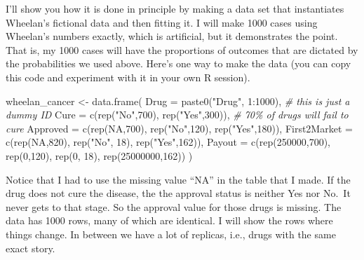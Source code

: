 \documentclass[
  openany]{book}
\newenvironment{Shaded}{\begin{snugshade}}{\end{snugshade}}
\newcommand{\AttributeTok}[1]{\textcolor[rgb]{0.77,0.63,0.00}{#1}}
\newcommand{\CommentTok}[1]{\textcolor[rgb]{0.56,0.35,0.01}{\textit{#1}}}
\newcommand{\ConstantTok}[1]{\textcolor[rgb]{0.00,0.00,0.00}{#1}}
\newcommand{\DecValTok}[1]{\textcolor[rgb]{0.00,0.00,0.81}{#1}}
\newcommand{\FunctionTok}[1]{\textcolor[rgb]{0.00,0.00,0.00}{#1}}
\newcommand{\NormalTok}[1]{#1}
\newcommand{\OtherTok}[1]{\textcolor[rgb]{0.56,0.35,0.01}{#1}}
\newcommand{\SpecialCharTok}[1]{\textcolor[rgb]{0.00,0.00,0.00}{#1}}
\newcommand{\StringTok}[1]{\textcolor[rgb]{0.31,0.60,0.02}{#1}}
\begin{document}
I'll show you how it is done in principle by making a data set that instantiates Wheelan's fictional data and then fitting it. I will make 1000 cases using Wheelan's numbers exactly, which is artificial, but it demonstrates the point. That is, my 1000 cases will have the proportions of outcomes that are dictated by the probabilities we used above. Here's one way to make the data (you can copy this code and experiment with it in your own R session).

\begin{Shaded}
\begin{Highlighting}[]
\NormalTok{wheelan\_cancer }\OtherTok{\textless{}{-}} \FunctionTok{data.frame}\NormalTok{(}
   \AttributeTok{Drug =} \FunctionTok{paste0}\NormalTok{(}\StringTok{"Drug"}\NormalTok{, }\DecValTok{1}\SpecialCharTok{:}\DecValTok{1000}\NormalTok{), }\CommentTok{\# this is just a dummy ID}
   \AttributeTok{Cure =} \FunctionTok{c}\NormalTok{(}\FunctionTok{rep}\NormalTok{(}\StringTok{"No"}\NormalTok{,}\DecValTok{700}\NormalTok{), }\FunctionTok{rep}\NormalTok{(}\StringTok{"Yes"}\NormalTok{,}\DecValTok{300}\NormalTok{)), }\CommentTok{\# 70\% of drugs will fail to cure}
   \AttributeTok{Approved =} \FunctionTok{c}\NormalTok{(}\FunctionTok{rep}\NormalTok{(}\ConstantTok{NA}\NormalTok{,}\DecValTok{700}\NormalTok{), }\FunctionTok{rep}\NormalTok{(}\StringTok{"No"}\NormalTok{,}\DecValTok{120}\NormalTok{), }\FunctionTok{rep}\NormalTok{(}\StringTok{"Yes"}\NormalTok{,}\DecValTok{180}\NormalTok{)),}
   \AttributeTok{First2Market =} \FunctionTok{c}\NormalTok{(}\FunctionTok{rep}\NormalTok{(}\ConstantTok{NA}\NormalTok{,}\DecValTok{820}\NormalTok{), }\FunctionTok{rep}\NormalTok{(}\StringTok{"No"}\NormalTok{, }\DecValTok{18}\NormalTok{), }\FunctionTok{rep}\NormalTok{(}\StringTok{"Yes"}\NormalTok{,}\DecValTok{162}\NormalTok{)),}
   \AttributeTok{Payout =} \FunctionTok{c}\NormalTok{(}\FunctionTok{rep}\NormalTok{(}\DecValTok{250000}\NormalTok{,}\DecValTok{700}\NormalTok{), }\FunctionTok{rep}\NormalTok{(}\DecValTok{0}\NormalTok{,}\DecValTok{120}\NormalTok{), }\FunctionTok{rep}\NormalTok{(}\DecValTok{0}\NormalTok{, }\DecValTok{18}\NormalTok{), }\FunctionTok{rep}\NormalTok{(}\DecValTok{25000000}\NormalTok{,}\DecValTok{162}\NormalTok{))}
\NormalTok{)}
\end{Highlighting}
\end{Shaded}

Notice that I had to use the missing value ``NA'' in the table that I made. If the drug does not cure the disease, the the approval status is neither Yes nor No.~It never gets to that stage. So the approval value for those drugs is missing. The data has 1000 rows, many of which are identical. I will show the rows where things change. In between we have a lot of replicas, i.e., drugs with the same exact story.
\end{document}
